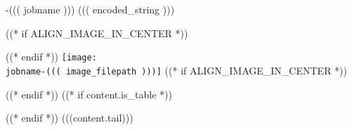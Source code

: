 
\begin{filecontents*}{\jobname-((( jobname )))}
((( encoded_string )))
\end{filecontents*}
\immediate{}

((* if ALIGN_IMAGE_IN_CENTER *))\begin{center}((* endif *))
\texttt{[image: \\jobname-((( image\_filepath )))]}
((* if ALIGN_IMAGE_IN_CENTER *))\end{center}((* endif *))
((* if content.is_table *))\par\vspace{-5pt}((* endif *))
(((content.tail)))
